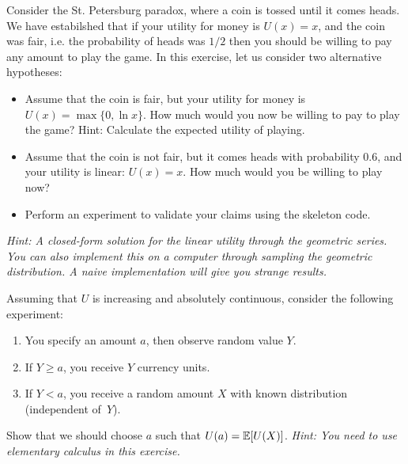 \documentclass[twoside,a4paper]{article}
\begin{document}
\begin{exercise}[15]
  Consider the St. Petersburg paradox, where a coin is tossed until it comes heads. 
  We have estabilshed that if your utility for money is $U(x) = x$, and the coin was fair, i.e. the probability of heads was $1/2$
  then you should be willing to pay any amount to play the game. In this exercise, let us consider two alternative hypotheses:
  \begin{itemize}
  \item  Assume that the coin is fair, but your utility for money is $U(x) = \max \{0, \ln x\}$. How much
    would you now be willing to pay to play the game? Hint: Calculate the expected utility of playing.
  \item Assume that the coin is not fair, but it comes heads with probability 0.6, and your
    utility is linear: $U(x) = x$. How much would you be willing to play now?
  \item Perform an experiment to validate your claims using the skeleton code.
  \end{itemize}
  \emph{Hint: A closed-form solution for the linear utility through the geometric series. You can also implement this on a computer through sampling the geometric distribution. A naive implementation will give you strange results.}
\end{exercise}


\begin{exercise}
  Assuming that $U$ is increasing and absolutely continuous, consider the following experiment:
  \begin{enumerate}
  \item You specify an amount $a$, then observe random value $Y$.
  \item If $Y \geq a$, you receive $Y$ currency units.
  \item If $Y < a$, you receive a random amount $X$ with known distribution (independent of~$Y$).
  \end{enumerate}
  Show that we should choose $a$ such that $U(a) = \mathop{\mbox{\ensuremath{\mathbb{E}}}}\nolimits[U(X)]$.
  \emph{Hint: You need to use elementary calculus in this exercise.}
\end{exercise}
\end{document}
